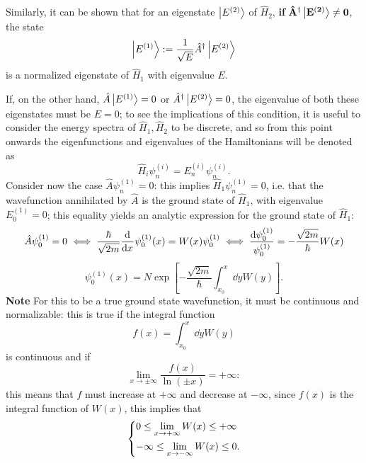 Similarly, it can be shown that for an eigenstate $\ket{E^{(2)}}$ of $\hat H_2$,
\textbf{if} $\mathbf{\hat A^\dagger\ket{E^{(2)}}\neq0}$, the state
\begin{equation}
\ket{E^{(1)}} :=\frac{1}{\sqrt{E}}\hat A^\dagger\ket{E^{(2)}}
\label{eq:A+_use}
\end{equation}
is a normalized eigenstate of $\hat H_1$ with eigenvalue $E$.

If, on the other hand, $\hat A \ket{E^{(1)}}=0$ or
$\hat A^\dagger \ket{E^{(2)}}=0$, the eigenvalue of both these eigenstates
must be $E=0$; to see the implications of this condition, it is useful to consider
the energy spectra of $\hat H_1,\hat H_2$ to be discrete, and so from this point
onwards the eigenfunctions and eigenvalues of the Hamiltonians will be denoted as
$$\hat H_i \psi^{(i)}_n = E^{(i)}_n\psi^{(i)}_n.$$
Consider now the case $\hat A \psi_n^{(1)}=0$: this implies $\hat H_1 \psi^{(1)}_n=0$, i.e. that
the wavefunction annihilated by $\hat A$ is the ground state of $\hat H_1$, with eigenvalue
$E^{(1)}_0=0$; this equality yields an analytic expression for the ground state of $\hat H_1$:
\begin{gather*}
\hat A \psi^{(1)}_0 = 0 \iff \frac{\hbar}{\sqrt{2m}}\dv[]{}{x}\psi^{(1)}_0(x) =
W(x)\psi^{(1)}_0 \iff \frac{\dd \psi^{(1)}_0}{\psi^{(1)}_0}=
-\frac{\sqrt{2m}}{\hbar}W(x)
\end{gather*}
\begin{equation}
\psi^{(1)}_0(x)=N\exp\left[-\frac{\sqrt{2m}}{\hbar}\int_{x_0}^{x}\dd y W(y)\right].
\label{eq:ground_state}
\end{equation}
\textbf{Note} For this to be a true ground state wavefunction, it must be
continuous and normalizable: this is true if the integral function
$$f(x) = \int_{x_0}^x \dd y W(y)$$
is continuous and if
$$\lim\limits_{x\to\pm\infty}\frac{f(x)}{\ln(\pm x)}=+\infty:$$
this means that $f$ must increase at $+\infty$ and decrease at $-\infty$, since
$f(x)$ is the integral function of $W(x)$, this implies that
\begin{equation}
\begin{dcases}
      0\leq\lim\limits_{x\to+\infty} W(x) \leq+\infty\\
      -\infty\leq\lim\limits_{x\to-\infty}W(x)\leq 0.
  \end{dcases}
    \label{eq:lim_W}
\end{equation}


